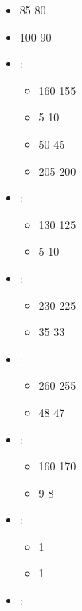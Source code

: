 \largefontsize{}

\subtitle{beta 2.2}

\begin{itemize}
\item \divinejudgement{} 85 \costdown{} 80
\item \might{} 100 \costdown{} 90
\item \duke{}\spacebeforecolon{}:
\begin{itemize}
\item \basecost{} 160 \costdown{} 155
\item \shield{} 5 \costup{} 10
\item \grailoath{} 50 \costdown{} 45
\item \hippogriff{} 205 \costdown{} 200
\end{itemize}
\item \paladin{}\spacebeforecolon{}:
\begin{itemize}
\item \basecost{} 130 \costdown{} 125
\item \shield{} 5 \costup{} 10
\end{itemize}
\item \knightsaspirant{}\spacebeforecolon{}:
\begin{itemize}
\item \basecost{} 230 \costdown{} 225
\item \extramodel{} 35 \costdown{} 33
\end{itemize}
\item \knightsoftherealm{}\spacebeforecolon{}:
\begin{itemize}
\item \basecost{} 260 \costdown{} 255
\item \extramodel{} 48 \costdown{} 47
\end{itemize}
\item \peasantbowmen{}\spacebeforecolon{}:
\begin{itemize}
\item \basecost{} 160 \costup{} 170
\item \extramodel{} 9 \costdown{} 8
\end{itemize}
\item \peasantlevy{}\spacebeforecolon{}:
\begin{itemize}
\item \spear{} 1 \costdown{} \free{}
\item \halberd{} 1 \costdown{} \free{}
\end{itemize}
\item \brigands{}\spacebeforecolon{}:

\end{itemize}
